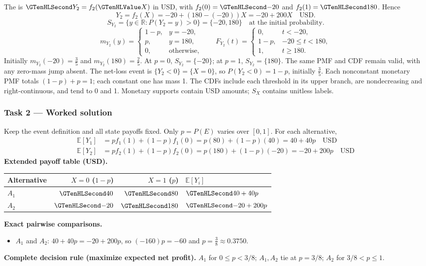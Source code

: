 The  is $\Money{Y_2}=f_2(\Indicator{X})$ in USD, with $f_2(0)=\Money{-20}$ and $f_2(1)=\Money{180}$. Hence
\[Y_2=f_2(X)=-20+(180-(-20))X=-20+200X\quad\text{USD}.\]
\[S_{Y_2}=\{y\in\mathbb R:P(Y_2=y)>0\}=\{-20,180\}\quad\text{at the initial probability}.\]
\[m_{Y_2}(y)=\begin{cases}1-p,&y=-20,\\p,&y=180,\\0,&\text{otherwise},\end{cases}\qquad F_{Y_2}(t)=\begin{cases}0,&t<-20,\\1-p,&-20\leq t<180,\\1,&t\geq 180.\end{cases}\]
Initially $m_{Y_2}(-20)=\frac{3}{5}$ and $m_{Y_2}(180)=\frac{2}{5}$. At $p=0$, $S_{Y_2}=\{-20\}$; at $p=1$, $S_{Y_2}=\{180\}$. The same PMF and CDF remain valid, with any zero-mass jump absent.
The net-loss event is $\{Y_2<0\}=\{X=0\}$, so $P(Y_2<0)=1-p$, initially $\frac{3}{5}$.
Each nonconstant monetary PMF totals $(1-p)+p=1$; each constant one has mass 1. The CDFs include each threshold in its upper branch, are nondecreasing and right-continuous, and tend to 0 and 1. Monetary supports contain USD amounts; $S_X$ contains unitless labels.
\clearpage\subsubsection*{Task 2 --- Worked solution}\label{sol:c3-inventory-decision}
Keep the event definition and all state payoffs fixed. Only $p=P(E)$ varies over $[0,1]$. For each alternative,
\begin{align*}
\mathbb E[Y_1]&=p f_1(1)+(1-p)f_1(0)=p(80)+(1-p)(40)=40+40p\quad\text{USD}\\
\mathbb E[Y_2]&=p f_2(1)+(1-p)f_2(0)=p(180)+(1-p)(-20)=-20+200p\quad\text{USD}
\end{align*}
\textbf{Extended payoff table (USD).}\begin{center}\begin{tabular}{lrrl}\toprule Alternative & $X=0$ ($1-p$) & $X=1$ ($p$) & $\mathbb E[Y_i]$\\\midrule
$A_1$ & $\Money{40}$ & $\Money{80}$ & $\Money{40+40p}$\\
$A_2$ & $\Money{-20}$ & $\Money{180}$ & $\Money{-20+200p}$\\
\bottomrule\end{tabular}\end{center}
\textbf{Exact pairwise comparisons.}\begin{itemize}
\item $A_1$ and $A_2$: $40+40p=-20+200p$, so $(-160)p=-60$ and $p=\frac{3}{8}\approx 0.3750$.
\end{itemize}
\textbf{Complete decision rule (maximize expected net profit).} $A_1$ for $0\leq p<3/8$; $A_1,A_2$ tie at $p=3/8$; $A_2$ for $3/8<p\leq1$.

